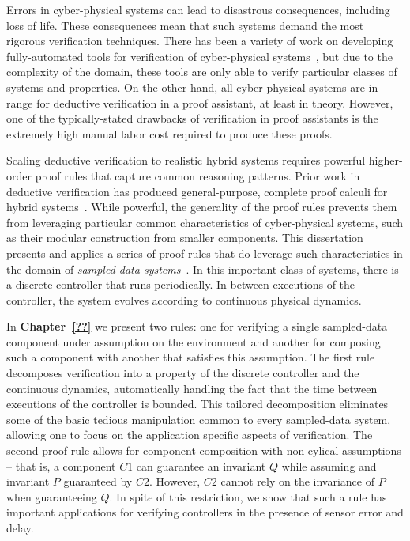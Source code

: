 \documentclass[12pt]{ucsddissertation}
\begin{document}
\begin{dissertationintroduction}
Errors in cyber-physical systems can lead to disastrous consequences,
including loss of life.  These consequences mean that such systems demand
the most rigorous verification techniques.  There has been a variety of
work on developing fully-automated tools for verification of cyber-physical
systems~\cite{PHAVerSTTT08,HyTechCAV97}, but due to the complexity of the
domain, these tools are only able to verify particular classes of systems
and properties.  On the other hand, all cyber-physical systems are in range
for deductive verification in a proof assistant, at least in theory.
However, one of the typically-stated drawbacks of verification in proof
assistants is the extremely high manual labor cost required to produce
these proofs.

Scaling deductive verification to realistic hybrid systems requires
powerful higher-order proof rules that capture common reasoning
patterns. Prior work in deductive verification has produced
general-purpose, complete proof calculi for hybrid
systems~\cite{platzer???,HHL???}. While powerful, the generality of the
proof rules prevents them from leveraging particular common characteristics
of cyber-physical systems, such as their modular construction from smaller
components. This dissertation presents and applies a series of proof rules
that do leverage such characteristics in the domain of \emph{sampled-data
  systems}~\cite{chen1995sampled}. In this important class of systems,
there is a discrete controller that runs periodically.  In between
executions of the controller, the system evolves according to continuous
physical dynamics.

In \textbf{Chapter~\ref{??}} we present two rules: one for verifying a single sampled-data
component under assumption on the environment and another for composing
such a component with another that satisfies this assumption. The first
rule decomposes verification into a property of the discrete controller and
the continuous dynamics, automatically handling the fact that the time
between executions of the controller is bounded. This tailored
decomposition eliminates some of the basic tedious manipulation common to
every sampled-data system, allowing one to focus on the application
specific aspects of verification. The second proof rule allows for
component composition with non-cylical assumptions -- that is, a component
$C1$ can guarantee an invariant $Q$ while assuming and invariant $P$
guaranteed by $C2$. However, $C2$ cannot rely on the invariance of $P$ when
guaranteeing $Q$. In spite of this restriction, we show that such a rule
has important applications for verifying controllers in the presence of
sensor error and delay.


\end{dissertationintroduction}
\end{document}

